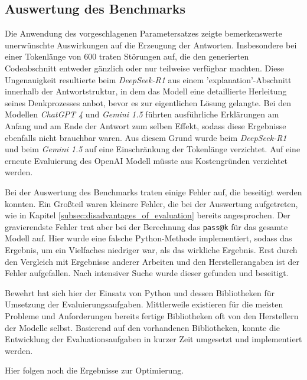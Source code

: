 \subsection{Auswertung des Benchmarks}
Die Anwendung des vorgeschlagenen Parametersatzes zeigte bemerkenswerte unerwünschte Auswirkungen auf die Erzeugung der Antworten. Insbesondere bei einer Tokenlänge von 600 traten Störungen auf, die den generierten Codeabschnitt entweder gänzlich oder nur teilweise verfügbar machten. Diese Ungenauigkeit resultierte beim \textit{DeepSeek-R1} aus einem 'explanation'-Abschnitt innerhalb der Antwortstruktur, in dem das Modell eine detaillierte Herleitung seines Denkprozesses anbot, bevor es zur eigentlichen Lösung gelangte. Bei den Modellen \textit{ChatGPT 4} und \textit{Gemini 1.5} führten ausführliche Erklärungen am Anfang und am Ende der Antwort zum selben Effekt, sodass diese Ergebnisse ebenfalls nicht brauchbar waren. Aus diesem Grund wurde beim \textit{DeepSeek-R1} und beim \textit{Gemini 1.5} auf eine Einschränkung der Tokenlänge verzichtet. Auf eine erneute Evaluierung des OpenAI Modell müsste aus Kostengründen verzichtet werden.\vspace{0.2cm}

Bei der Auswertung des Benchmarks traten einige Fehler auf, die beseitigt werden konnten. Ein Großteil waren kleinere Fehler, die bei der Auswertung aufgetreten, wie in Kapitel \ref{subsec:disadvantages_of_evaluation} bereits angesprochen. Der gravierendste Fehler trat aber bei der Berechnung das \texttt{pass@k} für das gesamte Modell auf. Hier wurde eine falsche Python-Methode implementiert, sodass das Ergebnis, um ein Vielfaches niedriger war, als das wirkliche Ergebnis. Erst durch den Vergleich mit Ergebnisse anderer Arbeiten und den Herstellerangaben ist der Fehler aufgefallen. Nach intensiver Suche wurde dieser gefunden und beseitigt.\vspace{0.2cm}

Bewehrt hat sich hier der Einsatz von Python und dessen Bibliotheken für Umsetzung der Evaluierungsaufgaben. Mittlerweile existieren für die meisten Probleme und Anforderungen bereits fertige Bibliotheken oft von den Herstellern der Modelle selbst. Basierend auf den vorhandenen Bibliotheken, konnte die Entwicklung der Evaluationsaufgaben in kurzer Zeit umgesetzt und implementiert werden.\vspace{0.2cm}


\begin{tcolorbox}[
	enhanced,
	colback=red!5!white,
	colframe=red!75!black!50,
	title= Mein roter Faden
	]
	Hier folgen noch die Ergebnisse zur Optimierung.
\end{tcolorbox}


